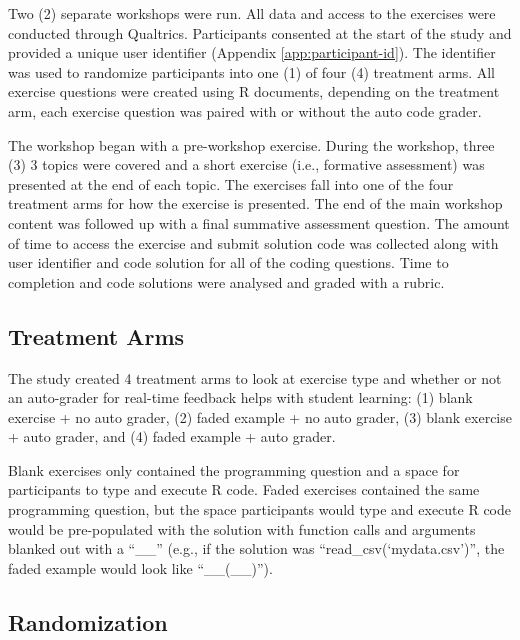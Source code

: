 \documentclass[040-assessment.tex]{subfiles}
\begin{document}
Two (2) separate workshops were run.
All data and access to the exercises were conducted through Qualtrics.
Participants consented at the start of the study and provided a unique user identifier
(Appendix \ref{app:participant-id}).
The identifier was used to randomize participants into one (1) of four (4) treatment arms.
All exercise questions were created using R  documents,
depending on the treatment arm, each exercise question was paired with or without
the  auto code grader.

The workshop began with a pre-workshop exercise.
During the workshop, three (3) 3 topics were covered and a short exercise (i.e., formative assessment)
was presented at the end of each topic.
The exercises fall into one of the four treatment arms for how the exercise is presented.
The end of the main workshop content was followed up with a final summative assessment question.
The amount of time to access the exercise and submit solution code was collected
along with user identifier and code solution for all of the coding questions.
Time to completion and code solutions were analysed and graded with a rubric.

\subsection{Treatment Arms}

    The study created 4 treatment arms to look at exercise type and whether or not an auto-grader for
    real-time feedback helps with student learning:
    (1) blank exercise + no auto grader,
    (2) faded example + no auto grader,
    (3) blank exercise + auto grader, and
    (4) faded example + auto grader.

    Blank exercises only contained the programming question and a space for participants to type and execute R code.
    Faded exercises contained the same programming question,
    but the space participants would type and execute R code would be pre-populated with the solution with
    function calls and arguments blanked out with a ``\_\_''
    (e.g., if the solution was ``read\_csv(`mydata.csv')'',
    the faded example would look like ``\_\_(\_\_)'').

\subsection{Randomization}
\end{document}
